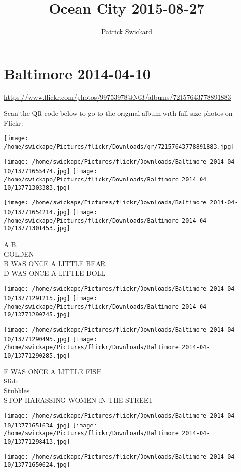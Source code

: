 \documentclass[10pt,letterpaper]{article}
\title{Ocean City 2015-08-27}
\author{Patrick Swickard}
\date{}
\begin{document}
\section*{Baltimore 2014-04-10}

\url{https://www.flickr.com/photos/99753978@N03/albums/72157643778891883}

Scan the QR code below to go to the original album with full-size photos on Flickr:

\texttt{[image: /home/swickape/Pictures/flickr/Downloads/qr/72157643778891883.jpg]}
\pagebreak

\texttt{[image: /home/swickape/Pictures/flickr/Downloads/Baltimore 2014-04-10/13771655474.jpg]}
\texttt{[image: /home/swickape/Pictures/flickr/Downloads/Baltimore 2014-04-10/13771303383.jpg]}

\texttt{[image: /home/swickape/Pictures/flickr/Downloads/Baltimore 2014-04-10/13771654214.jpg]}
\texttt{[image: /home/swickape/Pictures/flickr/Downloads/Baltimore 2014-04-10/13771301453.jpg]}

A.B.\\
GOLDEN\\
B WAS ONCE A LITTLE BEAR\\
D WAS ONCE A LITTLE DOLL
\pagebreak

\texttt{[image: /home/swickape/Pictures/flickr/Downloads/Baltimore 2014-04-10/13771291215.jpg]}
\texttt{[image: /home/swickape/Pictures/flickr/Downloads/Baltimore 2014-04-10/13771290745.jpg]}

\texttt{[image: /home/swickape/Pictures/flickr/Downloads/Baltimore 2014-04-10/13771290495.jpg]}
\texttt{[image: /home/swickape/Pictures/flickr/Downloads/Baltimore 2014-04-10/13771290285.jpg]}

F WAS ONCE A LITTLE FISH\\
Slide\\
Stubbles\\
STOP HARASSING WOMEN IN THE STREET
\pagebreak

\texttt{[image: /home/swickape/Pictures/flickr/Downloads/Baltimore 2014-04-10/13771651634.jpg]}
\texttt{[image: /home/swickape/Pictures/flickr/Downloads/Baltimore 2014-04-10/13771298413.jpg]}

\vspace{0.25in}
\texttt{[image: /home/swickape/Pictures/flickr/Downloads/Baltimore 2014-04-10/13771650624.jpg]}
\end{document}
